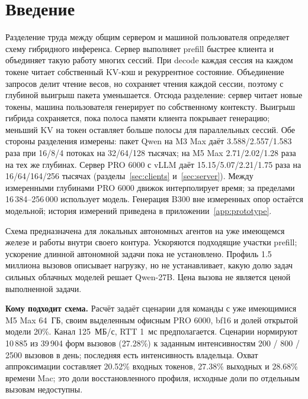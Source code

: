\section{Введение}

Разделение труда между общим сервером и машиной пользователя определяет схему гибридного инференса.
Сервер выполняет prefill быстрее клиента и объединяет такую работу многих сессий.
При decode каждая сессия на каждом токене читает собственный KV-кэш и рекуррентное состояние.
Объединение запросов делит чтение весов, но сохраняет чтения каждой сессии, поэтому с глубиной выигрыш пакета уменьшается.
Отсюда разделение: сервер читает новые токены, машина пользователя генерирует по собственному контексту.
Выигрыш гибрида сохраняется, пока полоса памяти клиента покрывает генерацию; меньший KV на токен оставляет больше полосы для параллельных сессий.
Обе стороны разделения измерены: пакет Qwen на M3 Max даёт 3.588/2.557/1.583 раза при 16/8/4 потоках на 32/64/128 тысячах;
на M5 Max 2.71/2.02/1.28 раза на тех же глубинах. Сервер PRO 6000 с vLLM даёт 15.15/5.07/2.21/1.75 раза
на 16/64/164/256 тысячах (разделы~\ref{sec:clients} и~\ref{sec:server}).
Между измеренными глубинами PRO 6000 движок интерполирует время; за пределами 16\,384--256\,000 использует модель.
Генерация B300 вне измеренных опор остаётся модельной; история измерений приведена в приложении~\ref{app:prototype}.

Схема предназначена для локальных автономных агентов на уже имеющемся железе и работы внутри своего контура.
Ускоряются подходящие участки prefill; ускорение длинной автономной задачи пока не установлено.
Профиль 1.5 миллиона вызовов описывает нагрузку, но не устанавливает, какую долю задач сильных облачных моделей
решает Qwen-27B. Цена вызова не является ценой выполненной задачи.

\textbf{Кому подходит схема.} Расчёт задаёт сценарии для команды с уже имеющимися M5 Max 64~ГБ,
своим выделенным офисным PRO 6000, bf16 и долей открытой модели 20\%.
Канал 125~МБ/с, RTT 1~мс предполагается. Сценарии нормируют 10\,885 из 39\,904 форм вызовов (27.28\%)
к заданным интенсивностям 200 / 800 / 2500 вызовов в день; последняя есть интенсивность владельца.
Охват аппроксимации составляет 20.52\% входных токенов, 27.38\% выходных и 28.68\% времени Mac;
это доли восстановленного профиля, исходные доли по отдельным вызовам недоступны.


